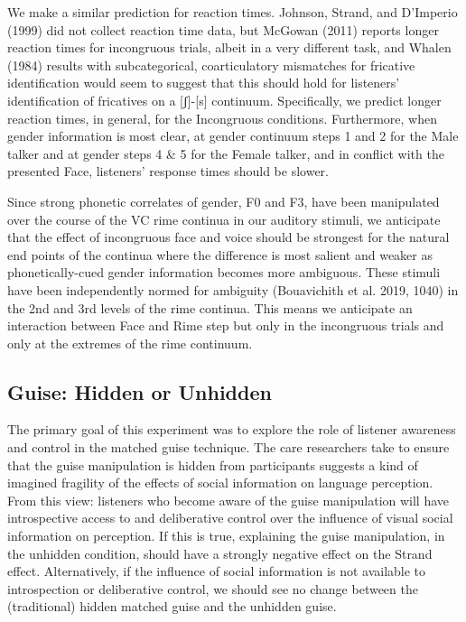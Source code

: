\documentclass[
  letterpaper,
  DIV=11,
  numbers=noendperiod]{scrartcl}
\begin{document}
We make a similar prediction for reaction times. Johnson, Strand, and
D'Imperio (1999) did not collect reaction time data, but McGowan (2011)
reports longer reaction times for incongruous trials, albeit in a very
different task, and Whalen (1984) results with subcategorical,
coarticulatory mismatches for fricative identification would seem to
suggest that this should hold for listeners' identification of
fricatives on a {[}ʃ{]}-{[}s{]} continuum. Specifically, we predict
longer reaction times, in general, for the Incongruous conditions.
Furthermore, when gender information is most clear, at gender continuum
steps 1 and 2 for the Male talker and at gender steps 4 \& 5 for the
Female talker, and in conflict with the presented Face, listeners'
response times should be slower.

Since strong phonetic correlates of gender, F0 and F3, have been
manipulated over the course of the VC rime continua in our auditory
stimuli, we anticipate that the effect of incongruous face and voice
should be strongest for the natural end points of the continua where the
difference is most salient and weaker as phonetically-cued gender
information becomes more ambiguous. These stimuli have been
independently normed for ambiguity (Bouavichith et al. 2019, 1040) in
the 2nd and 3rd levels of the rime continua. This means we anticipate an
interaction between Face and Rime step but only in the incongruous
trials and only at the extremes of the rime continuum.

\subsection{Guise: Hidden or Unhidden}\label{sec-pred-guise}

The primary goal of this experiment was to explore the role of listener
awareness and control in the matched guise technique. The care
researchers take to ensure that the guise manipulation is hidden from
participants suggests a kind of imagined fragility of the effects of
social information on language perception. From this view: listeners who
become aware of the guise manipulation will have introspective access to
and deliberative control over the influence of visual social information
on perception. If this is true, explaining the guise manipulation, in
the unhidden condition, should have a strongly negative effect on the
Strand effect. Alternatively, if the influence of social information is
not available to introspection or deliberative control, we should see no
change between the (traditional) hidden matched guise and the unhidden
guise.
\end{document}
